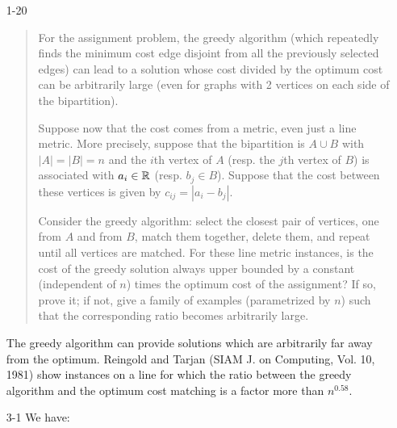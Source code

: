\documentclass[12pt]{article}
\begin{document}
\begin{enumerate}
\item[1-20]
\begin{quote}
  For the assignment problem, the greedy algorithm (which repeatedly
  finds the minimum cost edge disjoint from all the previously
  selected edges) can lead to a solution whose cost divided by the
  optimum cost can be arbitrarily large (even for graphs with 2
  vertices on each side of the bipartition).

Suppose now that the cost comes from a  metric, even just a line
metric. More precisely, suppose that the bipartition is $A \cup B$
with $|A|=|B|=n$ and the $i$th vertex of $A$ (resp. the $j$th vertex
of $B$) is associated with $a_i\in {\mathbb R}$ (resp. $b_j\in B$). Suppose
that the cost between these vertices is given by $c_{ij}=|a_i-b_j|$. 

Consider the greedy algorithm: select the closest pair of vertices,
one from $A$ and from $B$, match them together, delete them, and
repeat until all vertices are matched. For these line metric
instances, is the cost of the greedy solution always upper bounded by
a constant (independent of $n$) times the optimum cost of the
assignment? If so, prove it; if not, give a family of examples
(parametrized by $n$) such that the corresponding ratio becomes
arbitrarily large.
\end{quote}

The greedy algorithm can provide solutions which are arbitrarily
  far away from the optimum. Reingold and Tarjan (SIAM J. on
  Computing, Vol. 10, 1981) show instances on a line for which the
  ratio between the greedy algorithm and the optimum cost matching is
  a factor more than $n^{0.58}$.

\item[3-1]
We have: 


\end{enumerate}
\end{document}
